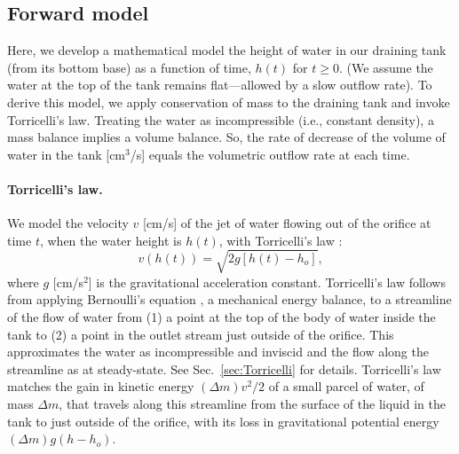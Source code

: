 \documentclass[a4paper,fleqn]{cas-dc}
\begin{document}
\subsection{Forward model} \label{sec:forward_model}
Here, we develop a mathematical model the height of water in our draining tank (from its bottom base) as a function of time, $h(t)$ for $t\geq 0$.
(We assume the water at the top of the tank remains flat---allowed by a slow outflow rate). 
To derive this model, we apply conservation of mass to the draining tank and invoke Torricelli's law.
Treating the water as incompressible (i.e., constant density), a mass balance implies a volume balance.
So, the rate of decrease of the volume of water in the tank [cm$^3$/s] equals the volumetric outflow rate at each time. 

\paragraph{Torricelli's law.}
We model the velocity $v$ [cm/s] of the jet of water flowing out of the orifice at time $t$, when the water height is $h(t)$, with Torricelli's law \cite{d2021torricelli}:
\begin{equation}
	v\left(h(t) \right) =  \sqrt{2 g[ h(t)-h_o] }, \label{eq:Torricelli}
\end{equation} where $g$ [cm/s$^2$] is the gravitational acceleration constant. 
Torricelli's law follows from applying Bernoulli's equation \cite{welty2020fundamentals}, a mechanical energy balance, to a streamline of the flow of water from (1) a point at the top of the body of water inside the tank to (2) a point in the outlet stream just outside of the orifice. 
This approximates the water as incompressible and inviscid and the flow along the streamline as at steady-state. See Sec.~\ref{sec:Torricelli} for details.
Torricelli's law matches the gain in kinetic energy $(\Delta m) v^2/2$ of a small parcel of water, of mass $\Delta m$, that travels along this streamline from the surface of the liquid in the tank to just outside of the orifice, with its loss in gravitational potential energy $(\Delta m)g(h-h_o)$.
\cite{groetsch1993inverse_tl,driver1998torricelli,williams2021vessel,epple2017verification}
\end{document}
